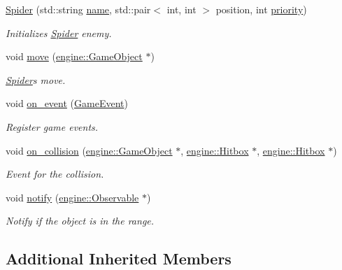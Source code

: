 \begin{DoxyCompactItemize}
\item 
\hyperlink{classmindscape_1_1_spider_a704f3d4f21322710c18928e0a1e9437d}{Spider} (std\+::string \hyperlink{classengine_1_1_game_object_a1f104f7af4f351e6d3278319762c9fe5}{name}, std\+::pair$<$ int, int $>$ position, int \hyperlink{classengine_1_1_game_object_a159ecaca30229e302793b11a75bd13c2}{priority})
\begin{DoxyCompactList}\small\item\em Initializes \hyperlink{classmindscape_1_1_spider}{Spider} enemy. \end{DoxyCompactList}\item 
void \hyperlink{classmindscape_1_1_spider_aff8def99a1891b772563409c1098b16e}{move} (\hyperlink{classengine_1_1_game_object}{engine\+::\+Game\+Object} $\ast$)
\begin{DoxyCompactList}\small\item\em \hyperlink{classmindscape_1_1_spider}{Spider}\textquotesingle{}s move. \end{DoxyCompactList}\item 
void \hyperlink{classmindscape_1_1_spider_a68e38dcd9353ec245ac984566671fd40}{on\+\_\+event} (\hyperlink{class_game_event}{Game\+Event})
\begin{DoxyCompactList}\small\item\em Register game events. \end{DoxyCompactList}\item 
void \hyperlink{classmindscape_1_1_spider_a388cb275593530dca18cf48ad68bf8ae}{on\+\_\+collision} (\hyperlink{classengine_1_1_game_object}{engine\+::\+Game\+Object} $\ast$, \hyperlink{classengine_1_1_hitbox}{engine\+::\+Hitbox} $\ast$, \hyperlink{classengine_1_1_hitbox}{engine\+::\+Hitbox} $\ast$)
\begin{DoxyCompactList}\small\item\em Event for the collision. \end{DoxyCompactList}\item 
void \hyperlink{classmindscape_1_1_spider_a4f88179ed3a8055f076fa916bf60d967}{notify} (\hyperlink{classengine_1_1_observable}{engine\+::\+Observable} $\ast$)
\begin{DoxyCompactList}\small\item\em Notify if the object is in the range. \end{DoxyCompactList}\end{DoxyCompactItemize}
\subsection*{Additional Inherited Members}


